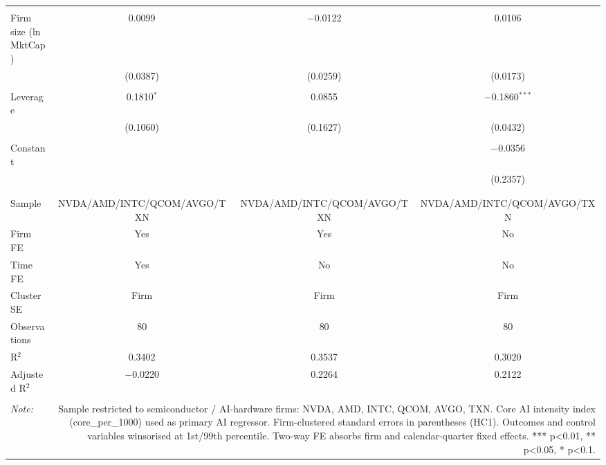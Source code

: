 \begin{table}[!htbp]
\begin{tabular}{@{\extracolsep{5pt}}lccc}
  & & & \\ 
 Firm size (ln MktCap) & 0.0099 & $-$0.0122 & 0.0106 \\ 
  & (0.0387) & (0.0259) & (0.0173) \\ 
  & & & \\ 
 Leverage & 0.1810$^{*}$ & 0.0855 & $-$0.1860$^{***}$ \\ 
  & (0.1060) & (0.1627) & (0.0432) \\ 
  & & & \\ 
 Constant &  &  & $-$0.0356 \\ 
  &  &  & (0.2357) \\ 
  & & & \\ 
\hline \\[-1.8ex] 
Sample & NVDA/AMD/INTC/QCOM/AVGO/TXN & NVDA/AMD/INTC/QCOM/AVGO/TXN & NVDA/AMD/INTC/QCOM/AVGO/TXN \\ 
Firm FE & Yes & Yes & No \\ 
Time FE & Yes & No & No \\ 
Cluster SE & Firm & Firm & Firm \\ 
Observations & 80 & 80 & 80 \\ 
R$^{2}$ & 0.3402 & 0.3537 & 0.3020 \\ 
Adjusted R$^{2}$ & $-$0.0220 & 0.2264 & 0.2122 \\ 
\hline 
\hline \\[-1.8ex] 
\textit{Note:}  & \multicolumn{3}{r}{Sample restricted to semiconductor / AI-hardware firms: NVDA, AMD, INTC, QCOM, AVGO, TXN. Core AI intensity index (core_per_1000) used as primary AI regressor. Firm-clustered standard errors in parentheses (HC1). Outcomes and control variables winsorised at 1st/99th percentile. Two-way FE absorbs firm and calendar-quarter fixed effects. *** p<0.01, ** p<0.05, * p<0.1.} \\ 
\end{tabular} 
\end{table} 
